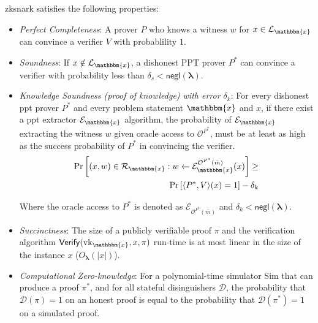 \begin{definition}
	\label{def:zkSNARK Properties}
	
	 \gls{zksnark} satisfies the following properties:
	
	\begin{itemize}
		\item \textit{Perfect Completeness}: A prover $P$ who knows a witness $w$ for $x\in \mathcal{L}_\mathbbm{x}$ can convince a verifier $V$ with probablility $1$.
		
		\item \textit{Soundness}: If  $x \notin \mathcal{L}_\mathbbm{x}$, a dishonest PPT prover $P^*$ can convince a verifier with probability less than $\delta_s < \mathsf{negl}(\boldsymbol{\lambda})$.
		
		\item \textit{Knowledge Soundness (proof of knowledge) with error $\delta_k$}: For every dishonest \gls{ppt} prover $P^*$ and every problem statement $\mathbbm{x}$ and $x$, if there exist a \gls{ppt} extractor $\mathcal{E}_\mathbbm{x}$ algorithm, the probability of $\mathcal{E}_\mathbbm{x}$ extracting the witness $w$ given oracle access to $\mathcal{O}^{P^*}$, must be at least as high as the success probability of $P^*$ in convincing the verifier.
		\begin{align*}
			\Pr\left[(x, w) \in \mathcal{R}_\mathbbm{x}: w \leftarrow \mathcal{E}_\mathbbm{x}^{\mathcal{O}^{P^*}(\bar{m})}(x)\right] \geq \\
			\Pr \left[ \langle P^*, V \rangle (x) = 1 \right] - \delta_k
		\end{align*}
		
		Where the oracle access to $P^*$ is denoted as $\mathcal{E}_{\mathcal{O}^{P^*}(\bar{m})}$ and $\delta_k < \mathsf{negl}(\boldsymbol{\lambda})$.
		
		\item \textit{Succinctness}: The size of a publicly verifiable proof $\pi$  and the verification algorithm $\mathsf{Verify}(\text{vk}_\mathbbm{x}, x, \pi)$ run-time is at most linear in the size of the instance $x$ ($O_{\boldsymbol{\lambda}}(|x|)$).
	
		
		\item \textit{Computational Zero-knowledge}: For a polynomial-time simulator \textsf{Sim} that can produce a proof $\pi^*$, and for all stateful disinguishers $\mathcal{D}$, the probability  that $\mathcal{D}(\pi)=1$ on an honest proof is equal to the probability that $\mathcal{D}(\pi^*)=1$ on a simulated proof.    
	\end{itemize}
	
\end{definition}

